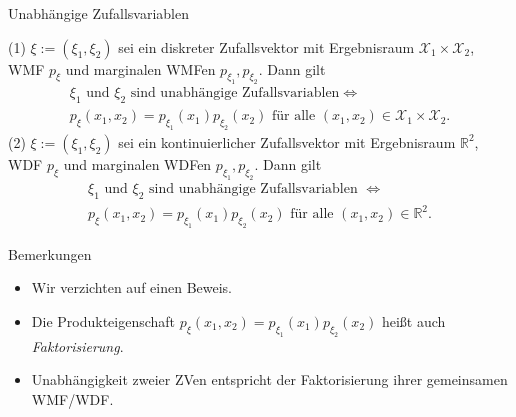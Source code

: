 \documentclass[
  8pt,
  ignorenonframetext,
]{beamer}
\providecommand{\tightlist}{%
  \setlength{\itemsep}{0pt}\setlength{\parskip}{0pt}}
\begin{document}
\begin{frame}{Unabhängige Zufallsvariablen}
\protect\hypertarget{unabhuxe4ngige-zufallsvariablen-1}{}
\small
\begin{theorem}
\justifying
\normalfont
(1) $\xi:= (\xi_1,\xi_2)$ sei ein diskreter Zufallsvektor mit Ergebnisraum
$\mathcal{X}_1 \times \mathcal{X}_2$, WMF $p_\xi$ und marginalen WMFen 
$p_{\xi_1}, p_{\xi_2}$. Dann gilt
\begin{multline}
\xi_1 \mbox{ und } \xi_2 \mbox{ sind unabhängige Zufallsvariablen} \Leftrightarrow \\
p_\xi(x_1,x_2) = p_{\xi_1}(x_1)p_{\xi_2}(x_2) \mbox{ für alle } (x_1,x_2) \in \mathcal{X}_1 \times \mathcal{X}_2.
\end{multline}
(2) $\xi:= (\xi_1,\xi_2)$ sei ein kontinuierlicher Zufallsvektor mit Ergebnisraum
$\mathbb{R}^2$, WDF $p_\xi$ und marginalen WDFen $p_{\xi_1}, p_{\xi_2}$. Dann gilt
\begin{multline}
\xi_1 \mbox{ und } \xi_2 \mbox{ sind unabhängige Zufallsvariablen } \Leftrightarrow \\
p_\xi(x_1,x_2) = p_{\xi_1}(x_1)p_{\xi_2}(x_2) \mbox{ für alle } (x_1,x_2) \in \mathbb{R}^2.
\end{multline}
\end{theorem}

Bemerkungen

\begin{itemize}
\tightlist
\item
  Wir verzichten auf einen Beweis.
\item
  Die Produkteigenschaft
  \(p_\xi(x_1,x_2) = p_{\xi_1}(x_1)p_{\xi_2}(x_2)\) heißt auch
  \textit{Faktorisierung}.
\item
  Unabhängigkeit zweier ZVen entspricht der Faktorisierung ihrer
  gemeinsamen WMF/WDF.
\end{itemize}
\end{frame}
\end{document}
